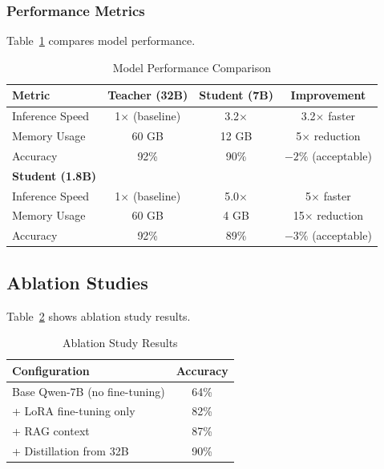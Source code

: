 \documentclass[11pt,a4paper]{article}
\begin{document}
\subsubsection{Performance Metrics}

Table~\ref{tab:performance} compares model performance.

\begin{table}[htbp]
\centering
\caption{Model Performance Comparison}
\label{tab:performance}
\begin{tabular}{lccc}
\toprule
\textbf{Metric} & \textbf{Teacher (32B)} & \textbf{Student (7B)} & \textbf{Improvement} \\
\midrule
Inference Speed & 1$\times$ (baseline) & 3.2$\times$ & 3.2$\times$ faster \\
Memory Usage & 60 GB & 12 GB & 5$\times$ reduction \\
Accuracy & 92\% & 90\% & $-2\%$ (acceptable) \\
\midrule
\textbf{Student (1.8B)} & & & \\
Inference Speed & 1$\times$ (baseline) & 5.0$\times$ & 5$\times$ faster \\
Memory Usage & 60 GB & 4 GB & 15$\times$ reduction \\
Accuracy & 92\% & 89\% & $-3\%$ (acceptable) \\
\bottomrule
\end{tabular}
\end{table}

\subsection{Ablation Studies}

Table~\ref{tab:ablation} shows ablation study results.

\begin{table}[htbp]
\centering
\caption{Ablation Study Results}
\label{tab:ablation}
\begin{tabular}{lc}
\toprule
\textbf{Configuration} & \textbf{Accuracy} \\
\midrule
Base Qwen-7B (no fine-tuning) & 64\% \\
+ LoRA fine-tuning only & 82\% \\
+ RAG context & 87\% \\
+ Distillation from 32B & 90\% \\
\bottomrule
\end{tabular}
\end{table}

\end{document}
